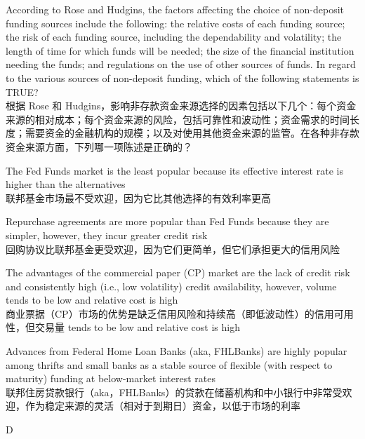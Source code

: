 \documentclass{article}
\newcounter{question} %
\begin{document}
\begin{question}
    According to Rose and Hudgins, the factors affecting the choice of non-deposit funding sources include the following: the relative costs of each funding source; the risk of each funding source, including the dependability and volatility; the length of time for which funds will be needed; the size of the financial institution needing the funds; and regulations on the use of other sources of funds. In regard to the various sources of non-deposit funding, which of the following statements is TRUE?\\
    根据 Rose 和 Hudgins，影响非存款资金来源选择的因素包括以下几个：每个资金来源的相对成本；每个资金来源的风险，包括可靠性和波动性；资金需求的时间长度；需要资金的金融机构的规模；以及对使用其他资金来源的监管。在各种非存款资金来源方面，下列哪一项陈述是正确的？
\end{question}

\begin{choices}
    \item The Fed Funds market is the least popular because its effective interest rate is higher than the alternatives\\
    联邦基金市场最不受欢迎，因为它比其他选择的有效利率更高
    \item Repurchase agreements are more popular than Fed Funds because they are simpler, however, they incur greater credit risk\\
    回购协议比联邦基金更受欢迎，因为它们更简单，但它们承担更大的信用风险
    \item The advantages of the commercial paper (CP) market are the lack of credit risk and consistently high (i.e., low volatility) credit availability, however, volume tends to be low and relative cost is high\\
    商业票据（CP）市场的优势是缺乏信用风险和持续高（即低波动性）的信用可用性，但交易量 tends to be low and relative cost is high
    \item Advances from Federal Home Loan Banks (aka, FHLBanks) are highly popular among thrifts and small banks as a stable source of flexible (with respect to maturity) funding at below-market interest rates\\
    联邦住房贷款银行（aka，FHLBanks）的贷款在储蓄机构和中小银行中非常受欢迎，作为稳定来源的灵活（相对于到期日）资金，以低于市场的利率
\end{choices}

\begin{correctanswer}
D
\end{correctanswer}
\end{document}
